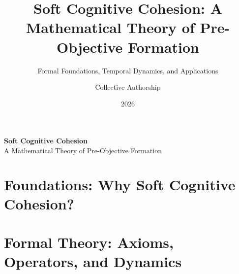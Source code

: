 \documentclass{SNmono}
\title{Soft Cognitive Cohesion: A Mathematical Theory of Pre-Objective Formation}
\subtitle{Formal Foundations, Temporal Dynamics, and Applications}
\author{Collective Authorship}
\date{2026}
\begin{document}
\thispagestyle{empty}
\vspace*{3cm}
{\centering
\Large\textbf{Soft Cognitive Cohesion}\\
\Large A Mathematical Theory of Pre-Objective Formation\\
\vspace{1cm}
}
\newpage

\frontmatter
\pagestyle{headings}



  
\fi





\tableofcontents
\cleardoublepage



\listoffigures
\cleardoublepage

\listofalgorithms
\cleardoublepage


\mainmatter

\part{Foundations: Why Soft Cognitive Cohesion?}
\label{part:foundations}





\part{Formal Theory: Axioms, Operators, and Dynamics}
\label{part:formal-theory}







\end{document}
